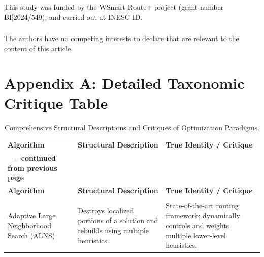 \documentclass[orivec,runningheads]{llncs}
\begin{document}
\begin{center}
\begin{longtable}
\begin{credits}
\subsubsection{\ackname} This study was funded by the WSmart Route+ project (grant number BI|2024/549), and carried out at INESC-ID.

\subsubsection{\discintname}
The authors have no competing interests to declare that are
relevant to the content of this article.
\end{credits}
%
%
%



\section{Appendix A: Detailed Taxonomic Critique Table}
\label{appendix:taxonomy}

\begin{center}
\small
\renewcommand{\arraystretch}{1.5}
\begin{longtable}{
  >{\raggedright\arraybackslash}p{}
  >{\raggedright\arraybackslash}p{}
  >{\raggedright\arraybackslash}p{}
}
\caption{Comprehensive Structural Descriptions and Critiques of Optimization Paradigms.} \label{tab:appendix_taxonomy} \\
\toprule
\textbf{Algorithm} & \textbf{Structural Description} & \textbf{True Identity / Critique} \\
\midrule
\endfirsthead

\multicolumn{3}{c}%
{{\bfseries \tablename\ \thetable{} -- continued from previous page}} \\
\toprule
\textbf{Algorithm} & \textbf{Structural Description} & \textbf{True Identity / Critique} \\
\midrule
\endhead

\midrule \multicolumn{3}{r}{{Continued on next page}} \\
\endfoot

\bottomrule
\endlastfoot

Adaptive Large Neighborhood Search (ALNS) & Destroys localized portions of a solution and rebuilds using multiple heuristics. & State-of-the-art routing framework; dynamically controls and weights multiple lower-level heuristics. \\ \midrule


\end{longtable}
\end{center}
\end{longtable}
\end{center}
\end{document}

